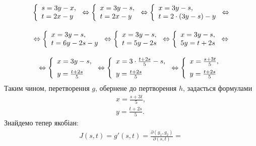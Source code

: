 \begin{example}
\[
\begin{array}c
\left\{
\begin{array}{l}
s = 3 y - x,\\
t = 2 x - y
\end{array}
\right.
\Leftrightarrow
\left\{
\begin{array}{l}
x = 3 y - s,\\
t = 2 x - y
\end{array}
\right.
\Leftrightarrow
\left\{
\begin{array}{l}
x = 3 y - s,\\
t = 2 \cdot (3 y - s) - y
\end{array}
\right.
\Leftrightarrow
\\[20pt]
\Leftrightarrow
\left\{
\begin{array}{l}
x = 3 y - s,\\
t = 6 y - 2 s - y
\end{array}
\right.
\Leftrightarrow
\left\{
\begin{array}{l}
x = 3 y - s,\\
t = 5 y - 2 s
\end{array}
\right.
\Leftrightarrow
\left\{
\begin{array}{l}
x = 3 y - s,\\
5 y = t + 2 s
\end{array}
\right.
\Leftrightarrow
\\[20pt]
\Leftrightarrow
\left\{
\begin{array}{l}
x = 3 y - s,\\[6pt]
y = \frac{t + 2 s}{5}
\end{array}
\right.
\Leftrightarrow
\left\{
\begin{array}{l}
x = 3 \cdot \frac{t + 2 s}{5} - s,\\[6pt]
y = \frac{t + 2 s}{5}
\end{array}
\right.
\Leftrightarrow
\left\{
\begin{array}{l}
x = \frac{s + 3 t}{5},\\[6pt]
y = \frac{t + 2 s}{5}
\end{array}
\right.
\end{array}
\]
Таким чином, перетворення $g$, обернене до пертворення $h$, задається формулами
\[
\begin{array}{l}
x = \frac{s + 3 t}{5},\\
y = \frac{t + 2 s}{5}.
\end{array}
\]
Знайдемо тепер якобіан:
\[
\begin{array}{c}
J(s, t) = g'(s, t) = \frac{\partial\left(g_1, g_2\right)}{\partial\left(s, t\right)} =

\end{array}\]
\end{example}
